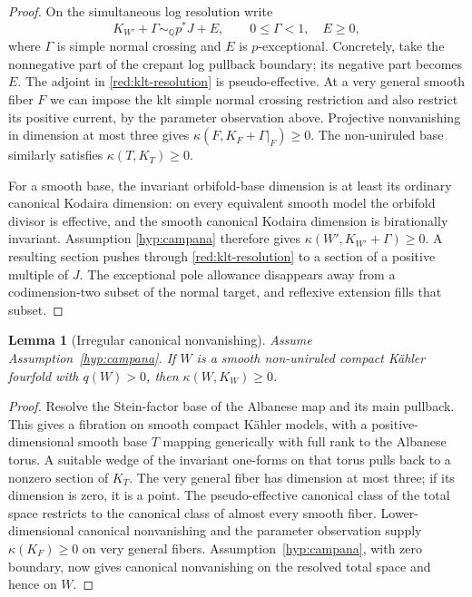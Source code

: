 \documentclass[11pt,letterpaper]{article}
\newtheorem{lemma}[theorem]{Lemma}
\theoremstyle{definition}
\theoremstyle{remark}
\begin{document}
\begin{proof}
On the simultaneous log resolution write
\begin{equation}\label{red:klt-resolution}
 K_{W'}+\Gamma\sim_{\mathbb{Q}}p^*J+E,
 \qquad 0\leq\Gamma<1,\quad E\geq0,
\end{equation}
where \(\Gamma\) is simple normal crossing and \(E\) is
\(p\)-exceptional. Concretely, take the nonnegative part of the crepant
log pullback boundary; its negative part becomes \(E\).
The adjoint in \eqref{red:klt-resolution} is pseudo-effective. At a
very general smooth fiber \(F\) we can impose the klt simple normal
crossing restriction and also restrict its positive current, by the
parameter observation above. Projective nonvanishing in dimension at
most three gives \(\kappa(F,K_F+\Gamma|_F)\geq0\). The non-uniruled
base similarly satisfies \(\kappa(T,K_T)\geq0\).

For a smooth base, the invariant orbifold-base dimension is at least
its ordinary canonical Kodaira dimension: on every equivalent smooth
model the orbifold divisor is effective, and the smooth canonical
Kodaira dimension is birationally invariant. Assumption
\ref{hyp:campana} therefore gives
\(\kappa(W',K_{W'}+\Gamma)\geq0\). A resulting section pushes through
\eqref{red:klt-resolution} to a section of a positive multiple of
\(J\). The exceptional pole allowance disappears away from a
codimension-two subset of the normal target, and reflexive extension
fills that subset.
\end{proof}

\begin{lemma}[Irregular canonical nonvanishing]\label{red:irregular}
Assume Assumption~\ref{hyp:campana}. If \(W\) is a smooth non-uniruled
compact Kähler fourfold with \(q(W)>0\), then \(\kappa(W,K_W)\geq0\).
\end{lemma}

\begin{proof}
Resolve the Stein-factor base of the Albanese map and its main pullback.
This gives a fibration on smooth compact Kähler models, with a
positive-dimensional smooth base \(T\) mapping generically with full
rank to the Albanese torus. A suitable wedge of the invariant
one-forms on that torus pulls back to a nonzero section of \(K_T\).
The very general fiber has dimension at most three; if its dimension
is zero, it is a point. The pseudo-effective canonical class of the
total space restricts to the canonical class of almost every smooth
fiber. Lower-dimensional canonical nonvanishing and the parameter
observation supply \(\kappa(K_F)\geq0\) on very general fibers.
Assumption~\ref{hyp:campana}, with zero boundary, now gives canonical
nonvanishing on the resolved total space and hence on \(W\).
\end{proof}
\end{document}
